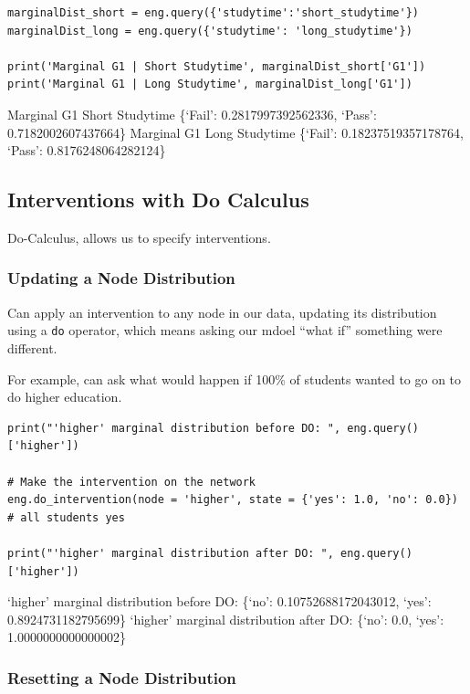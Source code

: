 \documentclass[
]{article}
\begin{document}
\begin{verbatim}
marginalDist_short = eng.query({'studytime':'short_studytime'})
marginalDist_long = eng.query({'studytime': 'long_studytime'})

print('Marginal G1 | Short Studytime', marginalDist_short['G1'])
print('Marginal G1 | Long Studytime', marginalDist_long['G1'])
\end{verbatim}

Marginal G1 \textbar{} Short Studytime \{`Fail': 0.2817997392562336,
`Pass': 0.7182002607437664\} Marginal G1 \textbar{} Long Studytime
\{`Fail': 0.18237519357178764, `Pass': 0.8176248064282124\}

\hypertarget{interventions-with-do-calculus}{%
\subsection{Interventions with Do
Calculus}\label{interventions-with-do-calculus}}

Do-Calculus, allows us to specify interventions.

\hypertarget{updating-a-node-distribution}{%
\subsubsection{Updating a Node
Distribution}\label{updating-a-node-distribution}}

Can apply an intervention to any node in our data, updating its
distribution using a \texttt{do} operator, which means
asking our mdoel ``what if'' something were different.

For example, can ask what would happen if 100\% of students wanted to go
on to do higher education.

\begin{verbatim}
print("'higher' marginal distribution before DO: ", eng.query()['higher'])

# Make the intervention on the network
eng.do_intervention(node = 'higher', state = {'yes': 1.0, 'no': 0.0}) # all students yes

print("'higher' marginal distribution after DO: ", eng.query()['higher'])
\end{verbatim}

`higher' marginal distribution before DO: \{`no': 0.10752688172043012,
`yes': 0.8924731182795699\} `higher' marginal distribution after DO:
\{`no': 0.0, `yes': 1.0000000000000002\}

\hypertarget{resetting-a-node-distribution}{%
\subsubsection{Resetting a Node
Distribution}\label{resetting-a-node-distribution}}
\end{document}
